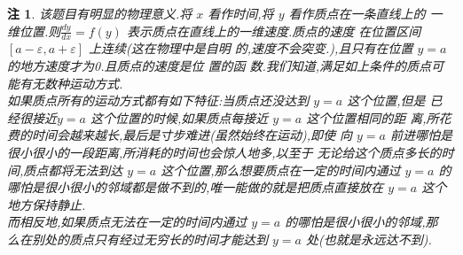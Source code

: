 \documentclass[a4paper, 12pt]{article} %
\newtheorem{ddtheorem}{注}
\newenvironment{remark}
{\bigskip\begin{mdframed}[backgroundcolor=gray!40,rightline=false,leftline=false,topline=false,bottomline=false]\begin{ddtheorem}}
    {\end{ddtheorem}\end{mdframed}\bigskip}
\begin{document}
\begin{remark}
  该题目有明显的物理意义.将 $x$ 看作时间,将 $y$ 看作质点在一条直线上的
  一维位置.则$\frac{dy}{dx}=f(y)$ 表示质点在直线上的一维速度.质点的速度
  在位置区间$[a-\varepsilon,a+\varepsilon]$ 上连续(这在物理中是自明
  的,速度不会突变.),且只有在位置 $y=a$ 的地方速度才为0.且质点的速度是位
  置的函
  数.我们知道,满足如上条件的质点可能有无数种运动方式.\\

  如果质点所有的运动方式都有如下特征:当质点还没达到 $y=a$ 这个位置,但是
  已经很接近$y=a$ 这个位置的时候,如果质点每接近 $y=a$ 这个位置相同的距
  离,所花费的时间会越来越长,最后是寸步难进(虽然始终在运动),即使
  向 $y=a$ 前进哪怕是很小很小的一段距离,所消耗的时间也会惊人地多,以至于
  无论给这个质点多长的时间,质点都将无法到达
  $y=a$ 这个位置,那么想要质点在一定的时间内通过 $y=a$ 的哪怕是很小很小的邻域都是做不到的,唯一能做的就是把质点直接放在 $y=a$ 这个地方保持静止.\\

  而相反地,如果质点无法在一定的时间内通过 $y=a$ 的哪怕是很小很小的邻域,那
  么在别处的质点只有经过无穷长的时间才能达到 $y=a$ 处(也就是永远达不到).
\end{remark}
\end{document}
